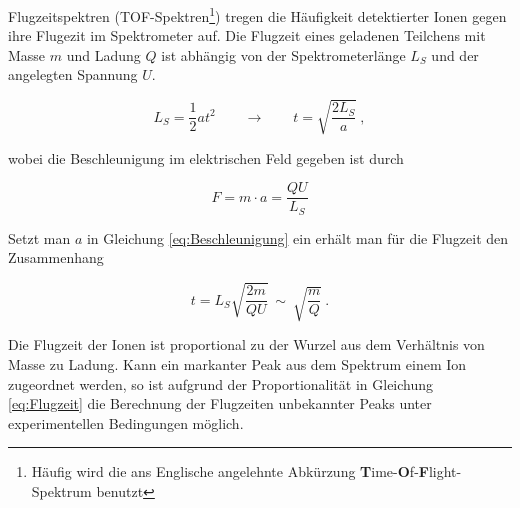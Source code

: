 Flugzeitspektren (TOF-Spektren\footnote{Häufig wird die ans Englische angelehnte Abkürzung \textbf{T}ime-\textbf{O}f-\textbf{F}light-Spektrum benutzt}) tregen die Häufigkeit detektierter Ionen gegen ihre Flugezit im Spektrometer auf. Die Flugzeit eines geladenen Teilchens mit Masse $m$ und Ladung $Q$ ist abhängig von der Spektrometerlänge $L_S$ und der angelegten Spannung $U$.

\begin{equation} \label{eq:Beschleunigung}
L_S = \frac{1}{2}at^2\qquad \rightarrow \qquad t = \sqrt{\frac{2L_S}{a}} \: ,
\end{equation} 

wobei die Beschleunigung im elektrischen Feld gegeben ist durch

\begin{equation}
F = m \cdot a = \frac{QU}{L_S}
\end{equation}

Setzt man $a$ in Gleichung \ref{eq:Beschleunigung} ein erhält man für die Flugzeit den Zusammenhang 

\begin{equation} \label{eq:Flugzeit}
t = L_S \sqrt{\frac{2m}{QU}}\: \sim \: \sqrt{\frac{m}{Q}} \: .
\end{equation}

Die Flugzeit der Ionen ist proportional zu der Wurzel aus dem Verhältnis von Masse zu Ladung. Kann ein markanter Peak aus dem Spektrum einem Ion zugeordnet werden, so ist aufgrund der Proportionalität in Gleichung \ref{eq:Flugzeit} die Berechnung der Flugzeiten unbekannter Peaks unter experimentellen Bedingungen möglich. %

